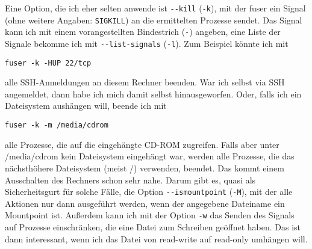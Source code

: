 \begin{normaltext}
  Eine Option, die ich eher selten anwende ist \verb?--kill? (\verb?-k?), mit
  der fuser ein Signal (ohne weitere Angaben: \verb?SIGKILL?) an die
  ermittelten Prozesse sendet. Das Signal kann ich mit einem vorangestellten
  Bindestrich (\verb?-?) angeben, eine Liste der Signale bekomme ich mit
  \verb?--list-signals? (\verb?-l?). Zum Beispiel könnte ich mit
  \begin{verbatim}
fuser -k -HUP 22/tcp
  \end{verbatim}
  alle SSH-Anmeldungen an diesem Rechner beenden. War ich selbst via SSH
  angemeldet, dann habe ich mich damit selbst hinausgeworfen. Oder, falls ich
  ein Dateisystem aushängen will, beende ich mit
  \begin{verbatim}
fuser -k -m /media/cdrom
  \end{verbatim}
  alle Prozesse, die auf die eingehängte CD-ROM zugreifen. Falls aber unter
  /media/cdrom kein Dateisystem eingehängt war, werden alle Prozesse, die das
  nächsthöhere Dateisystem (meist /) verwenden, beendet. Das kommt einem
  Ausschalten des Rechners schon sehr nahe. Darum gibt es, quasi als
  Sicherheitsgurt für solche Fälle, die Option \verb?--ismountpoint?
  (\verb?-M?), mit der alle Aktionen nur dann ausgeführt werden, wenn der
  angegebene Dateiname ein Mountpoint ist. Außerdem kann ich mit der Option
  \verb?-w? das Senden des Signals auf Prozesse einschränken, die eine Datei
  zum Schreiben geöffnet haben. Das ist dann interessant, wenn ich das Datei
  von read-write auf read-only umhängen will.

\end{normaltext}

